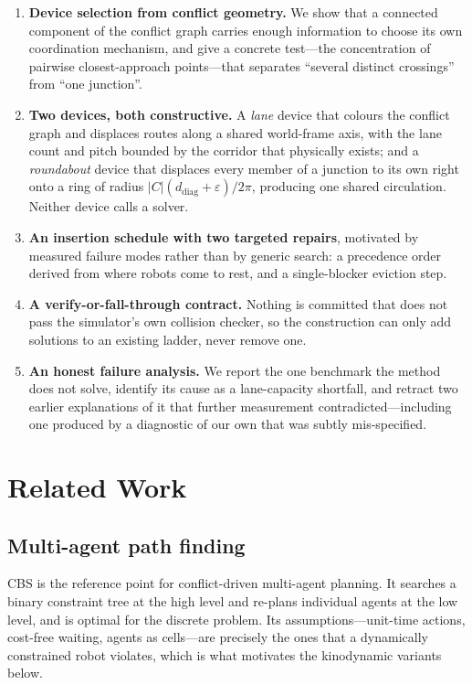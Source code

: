 \documentclass[conference]{IEEEtran}
\begin{document}
\begin{enumerate}
\item \textbf{Device selection from conflict geometry.} We show that a connected component
of the conflict graph carries enough information to choose its own coordination
mechanism, and give a concrete test---the concentration of pairwise closest-approach
points---that separates ``several distinct crossings'' from ``one junction''.

\item \textbf{Two devices, both constructive.} A \emph{lane} device that colours the
conflict graph and displaces routes along a shared world-frame axis, with the lane count
and pitch bounded by the corridor that physically exists; and a \emph{roundabout} device
that displaces every member of a junction to its own right onto a ring of radius
$|C|(d_{\mathrm{diag}}{+}\varepsilon)/2\pi$, producing one shared circulation. Neither
device calls a solver.

\item \textbf{An insertion schedule with two targeted repairs}, motivated by measured
failure modes rather than by generic search: a precedence order derived from where robots
come to rest, and a single-blocker eviction step.

\item \textbf{A verify-or-fall-through contract.} Nothing is committed that does not pass
the simulator's own collision checker, so the construction can only add solutions to an
existing ladder, never remove one.

\item \textbf{An honest failure analysis.} We report the one benchmark the method does not
solve, identify its cause as a lane-capacity shortfall, and retract two earlier
explanations of it that further measurement contradicted---including one produced by a
diagnostic of our own that was subtly mis-specified.
\end{enumerate}

\section{Related Work}

\subsection{Multi-agent path finding}
CBS \cite{cbs2015} is the reference point for conflict-driven multi-agent planning. It
searches a binary constraint tree at the high level and re-plans individual agents at the
low level, and is optimal for the discrete problem. Its assumptions---unit-time actions,
cost-free waiting, agents as cells---are precisely the ones that a dynamically constrained
robot violates, which is what motivates the kinodynamic variants below.
\end{document}

